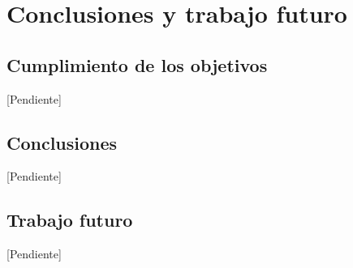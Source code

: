 \chapter{Conclusiones y trabajo futuro}
\label{cap:conclusiones}

\section{Cumplimiento de los objetivos}
[Pendiente]

\section{Conclusiones}
[Pendiente]

\section{Trabajo futuro}
[Pendiente]
